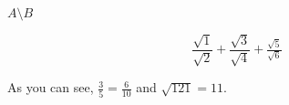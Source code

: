 $A \setminus B$

\[
    \dfrac{\sqrt{1}}{\sqrt{2}} +
    \frac{\sqrt{3}}{\sqrt{4}} +
    \tfrac{\sqrt{5}}{\sqrt{6}}
\]

As you can see, $\frac{3}{5} = \frac{6}{10}$ and $\sqrt{121} = 11$.

